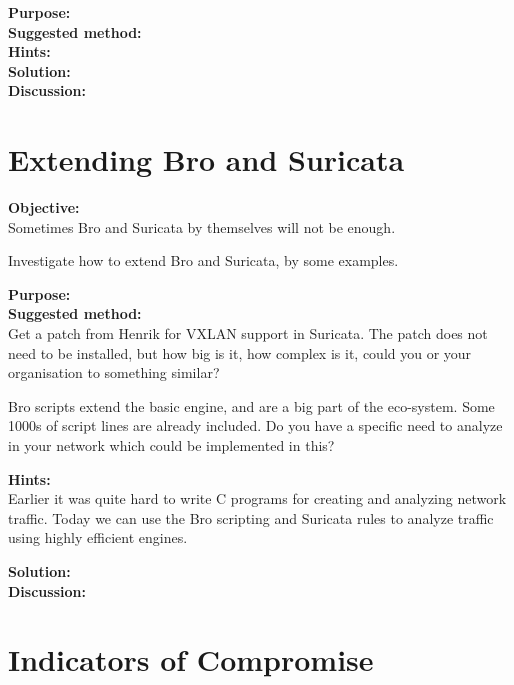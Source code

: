 \documentclass[a4paper,11pt,notitlepage]{report}
\begin{document}
{\bf Purpose:}\\



{\bf Suggested method:}\\



{\bf Hints:}\\



{\bf Solution:}\\



{\bf Discussion:}\\




\chapter{Extending Bro and Suricata}
\label{ex:}


{\bf Objective:} \\
Sometimes Bro and Suricata by themselves will not be enough.

Investigate how to extend Bro and Suricata, by some examples.

{\bf Purpose:}\\



{\bf Suggested method:}\\
Get a patch from Henrik for VXLAN support in Suricata. The patch does not need to be installed, but how big is it, how complex is it, could you or your organisation to something similar?

Bro scripts extend the basic engine, and are a big part of the eco-system. Some 1000s of script lines are already included. Do you have a specific need to analyze in your network which could be implemented in this?

{\bf Hints:}\\
Earlier it was quite hard to write C programs for creating and analyzing network traffic. Today we can use the Bro scripting and Suricata rules to analyze traffic using highly efficient engines.


{\bf Solution:}\\



{\bf Discussion:}\\




\chapter{Indicators of Compromise}
\label{ex:broioc}
\end{document}
